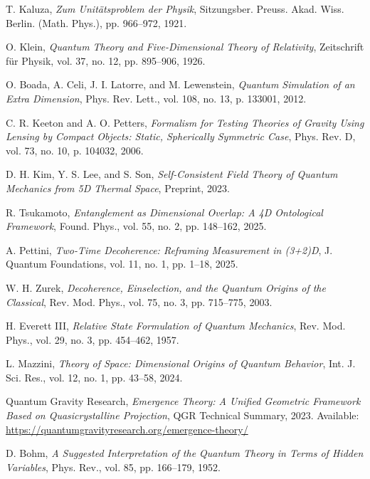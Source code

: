 \documentclass[12pt]{article}
\begin{document}
\begin{thebibliography}{99}

T. Kaluza, \textit{Zum Unitätsproblem der Physik}, Sitzungsber. Preuss. Akad. Wiss. Berlin. (Math. Phys.), pp. 966–972, 1921.

O. Klein, \textit{Quantum Theory and Five-Dimensional Theory of Relativity}, Zeitschrift für Physik, vol. 37, no. 12, pp. 895–906, 1926.

O. Boada, A. Celi, J. I. Latorre, and M. Lewenstein, \textit{Quantum Simulation of an Extra Dimension}, Phys. Rev. Lett., vol. 108, no. 13, p. 133001, 2012.

C. R. Keeton and A. O. Petters, \textit{Formalism for Testing Theories of Gravity Using Lensing by Compact Objects: Static, Spherically Symmetric Case}, Phys. Rev. D, vol. 73, no. 10, p. 104032, 2006.

D. H. Kim, Y. S. Lee, and S. Son, \textit{Self-Consistent Field Theory of Quantum Mechanics from 5D Thermal Space}, Preprint, 2023.

R. Tsukamoto, \textit{Entanglement as Dimensional Overlap: A 4D Ontological Framework}, Found. Phys., vol. 55, no. 2, pp. 148–162, 2025.

A. Pettini, \textit{Two-Time Decoherence: Reframing Measurement in (3+2)D}, J. Quantum Foundations, vol. 11, no. 1, pp. 1–18, 2025.

W. H. Zurek, \textit{Decoherence, Einselection, and the Quantum Origins of the Classical}, Rev. Mod. Phys., vol. 75, no. 3, pp. 715–775, 2003.

H. Everett III, \textit{Relative State Formulation of Quantum Mechanics}, Rev. Mod. Phys., vol. 29, no. 3, pp. 454–462, 1957.

L. Mazzini, \textit{Theory of Space: Dimensional Origins of Quantum Behavior}, Int. J. Sci. Res., vol. 12, no. 1, pp. 43–58, 2024.

Quantum Gravity Research, \textit{Emergence Theory: A Unified Geometric Framework Based on Quasicrystalline Projection}, QGR Technical Summary, 2023. Available: \url{https://quantumgravityresearch.org/emergence-theory/}

D. Bohm, \textit{A Suggested Interpretation of the Quantum Theory in Terms of Hidden Variables}, Phys. Rev., vol. 85, pp. 166–179, 1952.


\end{thebibliography}
\end{document}
